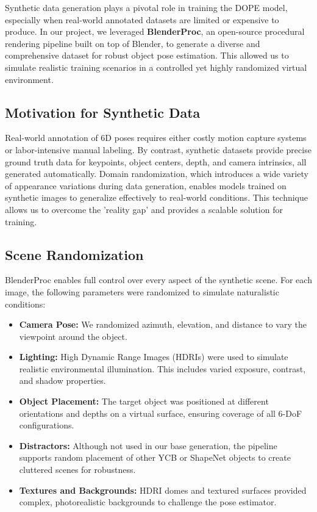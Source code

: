 \documentclass[conference]{IEEEtran}
\begin{document}
Synthetic data generation plays a pivotal role in training the DOPE model, especially when real-world annotated datasets are limited or expensive to produce. In our project, we leveraged 	\textbf{BlenderProc}, an open-source procedural rendering pipeline built on top of Blender, to generate a diverse and comprehensive dataset for robust object pose estimation. This allowed us to simulate realistic training scenarios in a controlled yet highly randomized virtual environment.

\subsection{Motivation for Synthetic Data}

Real-world annotation of 6D poses requires either costly motion capture systems or labor-intensive manual labeling. By contrast, synthetic datasets provide precise ground truth data for keypoints, object centers, depth, and camera intrinsics, all generated automatically. Domain randomization, which introduces a wide variety of appearance variations during data generation, enables models trained on synthetic images to generalize effectively to real-world conditions. This technique allows us to overcome the 'reality gap' and provides a scalable solution for training.

\subsection{Scene Randomization}

BlenderProc enables full control over every aspect of the synthetic scene. For each image, the following parameters were randomized to simulate naturalistic conditions:

\begin{itemize}
\item \textbf{Camera Pose:} We randomized azimuth, elevation, and distance to vary the viewpoint around the object.
\item \textbf{Lighting:} High Dynamic Range Images (HDRIs) were used to simulate realistic environmental illumination. This includes varied exposure, contrast, and shadow properties.
\item \textbf{Object Placement:} The target object was positioned at different orientations and depths on a virtual surface, ensuring coverage of all 6-DoF configurations.
\item \textbf{Distractors:} Although not used in our base generation, the pipeline supports random placement of other YCB or ShapeNet objects to create cluttered scenes for robustness.
\item \textbf{Textures and Backgrounds:} HDRI domes and textured surfaces provided complex, photorealistic backgrounds to challenge the pose estimator.
\end{itemize}
\end{document}
